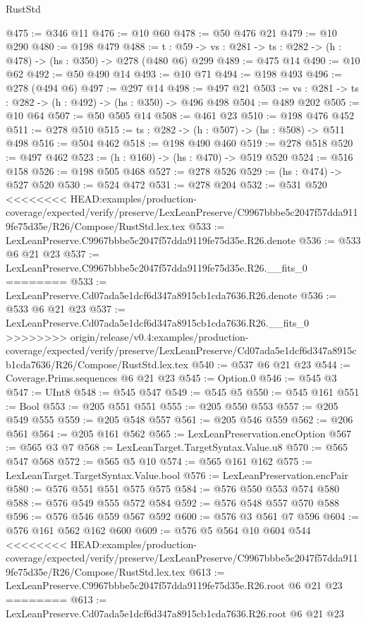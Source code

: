 \begin{lexlean}{RustStd}
\begin{coremodule}
{\begin{coremodule}
@475 := @346 @11
@476 := @10 @60
@478 := @50 @476 @21
@479 := @10 @290
@480 := @198 @479
@488 := {t : @59} -> {vs : @281} -> {ts : @282} -> (h : @478) -> (hs : @350) -> @278 (@480 @6) @299
@489 := @475 @14
@490 := @10 @62
@492 := @50 @490 @14
@493 := @10 @71
@494 := @198 @493
@496 := @278 (@494 @6)
@497 := @297 @14
@498 := @497 @21
@503 := {vs : @281} -> {ts : @282} -> (h : @492) -> (hs : @350) -> @496 @498
@504 := @489 @202
@505 := @10 @64
@507 := @50 @505 @14
@508 := @461 @23
@510 := @198 @476 @452
@511 := @278 @510
@515 := {ts : @282} -> (h : @507) -> (hs : @508) -> @511 @498
@516 := @504 @462
@518 := @198 @490 @460
@519 := @278 @518
@520 := @497 @462
@523 := (h : @160) -> (hs : @470) -> @519 @520
@524 := @516 @158
@526 := @198 @505 @468
@527 := @278 @526
@529 := (hs : @474) -> @527 @520
@530 := @524 @472
@531 := @278 @204
@532 := @531 @520
<<<<<<<< HEAD:examples/production-coverage/expected/verify/preserve/LexLeanPreserve/C9967bbbe5c2047f57dda9119fe75d35e/R26/Compose/RustStd.lex.tex
@533 := LexLeanPreserve.C9967bbbe5c2047f57dda9119fe75d35e.R26.denote
@536 := @533 @6 @21 @23
@537 := LexLeanPreserve.C9967bbbe5c2047f57dda9119fe75d35e.R26.__fits_0
========
@533 := LexLeanPreserve.Cd07ada5e1dcf6d347a8915cb1cda7636.R26.denote
@536 := @533 @6 @21 @23
@537 := LexLeanPreserve.Cd07ada5e1dcf6d347a8915cb1cda7636.R26.__fits_0
>>>>>>>> origin/release/v0.4:examples/production-coverage/expected/verify/preserve/LexLeanPreserve/Cd07ada5e1dcf6d347a8915cb1cda7636/R26/Compose/RustStd.lex.tex
@540 := @537 @6 @21 @23
@544 := Coverage.Prims.sequences @6 @21 @23
@545 := Option.{0}
@546 := @545 @3
@547 := UInt8
@548 := @545 @547
@549 := @545 @5
@550 := @545 @161
@551 := Bool
@553 := @205 @551 @551
@555 := @205 @550 @553
@557 := @205 @549 @555
@559 := @205 @548 @557
@561 := @205 @546 @559
@562 := @206 @561
@564 := @205 @161 @562
@565 := LexLeanPreservation.encOption
@567 := @565 @3 @7
@568 := LexLeanTarget.TargetSyntax.Value.u8
@570 := @565 @547 @568
@572 := @565 @5 @10
@574 := @565 @161 @162
@575 := LexLeanTarget.TargetSyntax.Value.bool
@576 := LexLeanPreservation.encPair
@580 := @576 @551 @551 @575 @575
@584 := @576 @550 @553 @574 @580
@588 := @576 @549 @555 @572 @584
@592 := @576 @548 @557 @570 @588
@596 := @576 @546 @559 @567 @592
@600 := @576 @3 @561 @7 @596
@604 := @576 @161 @562 @162 @600
@609 := @576 @5 @564 @10 @604 @544
<<<<<<<< HEAD:examples/production-coverage/expected/verify/preserve/LexLeanPreserve/C9967bbbe5c2047f57dda9119fe75d35e/R26/Compose/RustStd.lex.tex
@613 := LexLeanPreserve.C9967bbbe5c2047f57dda9119fe75d35e.R26.root @6 @21 @23
========
@613 := LexLeanPreserve.Cd07ada5e1dcf6d347a8915cb1cda7636.R26.root @6 @21 @23

\end{coremodule}}
\end{coremodule}
\end{lexlean}
